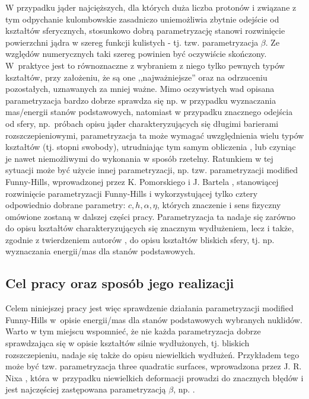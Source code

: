 \documentclass[a4paper,polish,twoside]{article}
\numberwithin{equation}{section}
\begin{document}
W przypadku jąder najcięższych, dla których duża liczba protonów i związane z tym odpychanie kulombowskie zasadniczo uniemożliwia zbytnie odejście od kształtów sferycznych, stosunkowo dobrą parametryzację stanowi rozwinięcie powierzchni jądra w szereg funkcji kulistych - tj. tzw. parametryzacja $\beta$. Ze względów numerycznych taki szereg powinien być oczywiście skończony. W~praktyce jest to równoznaczne z wybraniem z niego tylko pewnych typów kształtów, przy założeniu, że są one ,,najważniejsze'' oraz na odrzuceniu pozostałych, uznawanych za mniej ważne. Mimo oczywistych wad opisana parametryzacja bardzo dobrze sprawdza się np. w przypadku wyznaczania mas/energii stanów podstawowych, natomiast w przypadku znacznego odejścia od sfery, np.~próbach opisu jąder charakteryzujących się długimi barierami rozszczepieniowymi, parametryzacja ta może wymagać uwzględnienia wielu typów kształtów (tj. stopni swobody), utrudniając tym samym obliczenia \cite{Jach1}, lub czyniąc je nawet niemożliwymi do wykonania w sposób rzetelny. Ratunkiem w tej sytuacji może być użycie innej parametryzacji, np. tzw. parametryzacji modified Funny-Hills, wprowadzonej przez K. Pomorskiego i J. Bartela \cite{MFH}, stanowiącej rozwinięcie parametryzacji Funny-Hills \cite{OLDMFH} i wykorzystującej tylko cztery odpowiednio dobrane parametry: $c, h, \alpha, \eta$, których znaczenie i sens fizyczny omówione zostaną w dalszej części pracy. Parametryzacja ta nadaje się zarówno do opisu kształtów charakteryzujących się znacznym wydłużeniem, lecz i także, zgodnie z twierdzeniem autorów \cite{MFH}, do opisu kształtów bliskich sfery, tj. np. wyznaczania energii/mas dla stanów podstawowych.

\clearpage
\subsection{Cel pracy oraz sposób jego realizacji}

Celem niniejszej pracy jest więc sprawdzenie działania parametryzacji modified Funny-Hills w~opisie energii/mas dla stanów podstawowych wybranych nuklidów. Warto w tym miejscu wspomnieć, że nie każda parametryzacja dobrze sprawdzająca się w opisie kształtów silnie wydłużonych, tj. bliskich rozszczepieniu, nadaje się także do opisu niewielkich wydłużeń. Przykładem tego może być tzw. parametryzacja three quadratic surfaces, wprowadzona przez J. R. Nixa \cite{NIX}, która w~przypadku niewielkich deformacji prowadzi do znacznych błędów i jest najczęściej zastępowana parametryzacją $\beta$, np. \cite{Moll2009}.
\end{document}
